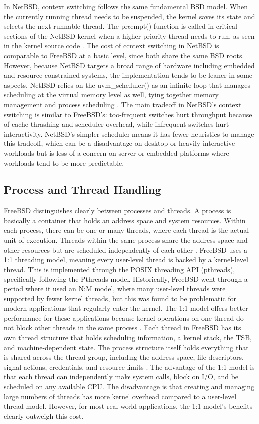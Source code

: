 In NetBSD, context switching follows the same fundamental BSD model. When the currently running thread needs to be suspended, the kernel saves its state and selects the next runnable thread. The preempt() function is called in critical sections of the NetBSD kernel when a higher-priority thread needs to run, as seen in the kernel source code \parencite{netBSDnd}.
The cost of context switching in NetBSD is comparable to FreeBSD at a basic level, since both share the same BSD roots. However, because NetBSD targets a broad range of hardware including embedded and resource-constrained systems, the implementation tends to be leaner in some aspects. NetBSD relies on the uvm\_scheduler() as an infinite loop that manages scheduling at the virtual memory level as well, tying together memory management and process scheduling \parencite{netBSDnd}.
The main tradeoff in NetBSD's context switching is similar to FreeBSD's: too-frequent switches hurt throughput because of cache thrashing and scheduler overhead, while infrequent switches hurt interactivity. NetBSD's simpler scheduler means it has fewer heuristics to manage this tradeoff, which can be a disadvantage on desktop or heavily interactive workloads but is less of a concern on server or embedded platforms where workloads tend to be more predictable.

\subsection{Process and Thread Handling}
FreeBSD distinguishes clearly between processes and threads. A process is basically a container that holds an address space and system resources. Within each process, there can be one or many threads, where each thread is the actual unit of execution. Threads within the same process share the address space and other resources but are scheduled independently of each other \parencite{watson2015}.
FreeBSD uses a 1:1 threading model, meaning every user-level thread is backed by a kernel-level thread. This is implemented through the POSIX threading API (pthreads), specifically following the Pthreads model. Historically, FreeBSD went through a period where it used an N:M model, where many user-level threads were supported by fewer kernel threads, but this was found to be problematic for modern applications that regularly enter the kernel. The 1:1 model offers better performance for these applications because kernel operations on one thread do not block other threads in the same process \parencite{watson2015}.
Each thread in FreeBSD has its own thread structure that holds scheduling information, a kernel stack, the TSB, and machine-dependent state. The process structure itself holds everything that is shared across the thread group, including the address space, file descriptors, signal actions, credentials, and resource limits \parencite{watson2015}.
The advantage of the 1:1 model is that each thread can independently make system calls, block on I/O, and be scheduled on any available CPU. The disadvantage is that creating and managing large numbers of threads has more kernel overhead compared to a user-level thread model. However, for most real-world applications, the 1:1 model's benefits clearly outweigh this cost.

